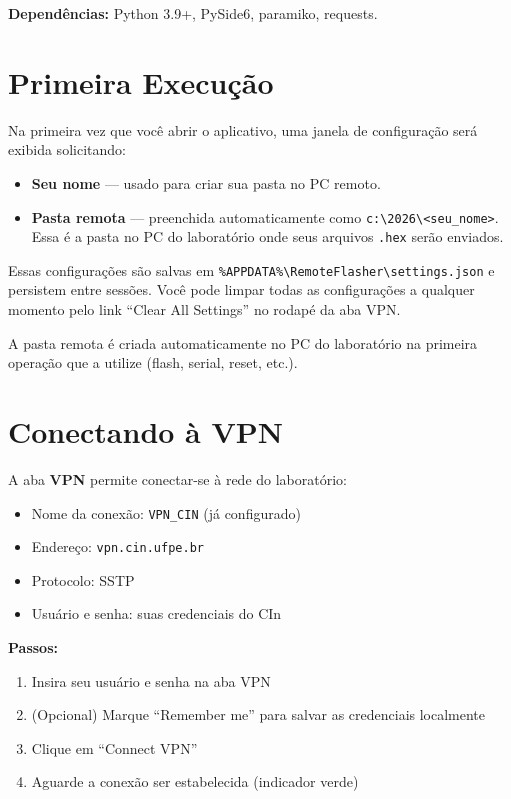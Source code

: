 \documentclass[12pt,a4paper]{article}
\begin{document}
\textbf{Dependências:} Python 3.9+, PySide6, paramiko, requests.

\section{Primeira Execução}

Na primeira vez que você abrir o aplicativo, uma janela de configuração será exibida solicitando:

\begin{itemize}[nosep]
  \item \textbf{Seu nome} --- usado para criar sua pasta no PC remoto.
  \item \textbf{Pasta remota} --- preenchida automaticamente como \texttt{c:\textbackslash 2026\textbackslash <seu\_nome>}. Essa é a pasta no PC do laboratório onde seus arquivos \texttt{.hex} serão enviados.
\end{itemize}

Essas configurações são salvas em \texttt{\%APPDATA\%\textbackslash RemoteFlasher\textbackslash settings.json} e persistem entre sessões. Você pode limpar todas as configurações a qualquer momento pelo link ``Clear All Settings'' no rodapé da aba VPN.

A pasta remota é criada automaticamente no PC do laboratório na primeira operação que a utilize (flash, serial, reset, etc.).

\section{Conectando à VPN}

A aba \textbf{VPN} permite conectar-se à rede do laboratório:

\begin{itemize}[nosep]
  \item Nome da conexão: \texttt{VPN\_CIN} (já configurado)
  \item Endereço: \texttt{vpn.cin.ufpe.br}
  \item Protocolo: SSTP
  \item Usuário e senha: suas credenciais do CIn
\end{itemize}

\textbf{Passos:}
\begin{enumerate}[nosep]
  \item Insira seu usuário e senha na aba VPN
  \item (Opcional) Marque ``Remember me'' para salvar as credenciais localmente
  \item Clique em ``Connect VPN''
  \item Aguarde a conexão ser estabelecida (indicador verde)
\end{enumerate}
\end{document}
